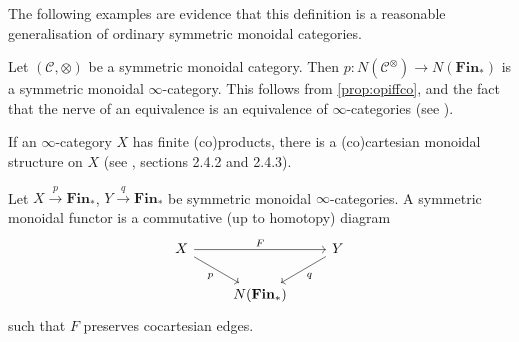 \documentclass{MetricNotes2023}
\begin{document}
The following examples are evidence that this definition is a reasonable generalisation of ordinary symmetric monoidal categories. 

\begin{example}
Let \((\mathcal{C}, \otimes)\) be a symmetric monoidal category. Then \(p : N(\mathcal{C}^\otimes) \to N(\textbf{Fin}_*)\) is a symmetric monoidal \(\infty\)-category. This follows from \ref{prop:opiffco}, and the fact that the nerve of an equivalence is an equivalence of  \(\infty\)-categories (see \cite[\href{https://kerodon.net/tag/01E1}{Example 01E1}]{kerodon}). 
\end{example}

\begin{example}
If an \(\infty\)-category \(X\) has finite (co)products, there is a (co)cartesian monoidal structure on \(X\) (see \autocite{higheralgebra}, sections 2.4.2 and 2.4.3). 
\end{example}

\begin{definition}
Let \(X \xrightarrow p \textbf{Fin}_*\), \(Y\xrightarrow q \textbf{Fin}_*\) be symmetric monoidal \(\infty\)-categories. A symmetric monoidal functor is a commutative (up to homotopy) diagram
\[\begin{tikzcd}
X \arrow[rr, "F"] \arrow[dr, swap, "p"]  & & Y \arrow[dl, "q"]  \\
& N(\textbf{Fin}_*)  & 
\end{tikzcd}\]
such that \(F\) preserves cocartesian edges.
\end{definition}

\printbibliography
\end{document}

